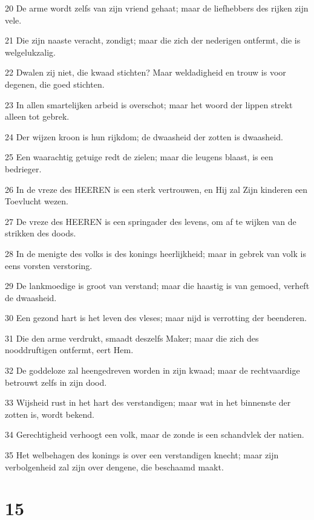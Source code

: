 \par 20 De arme wordt zelfs van zijn vriend gehaat; maar de liefhebbers des rijken zijn vele.
\par 21 Die zijn naaste veracht, zondigt; maar die zich der nederigen ontfermt, die is welgelukzalig.
\par 22 Dwalen zij niet, die kwaad stichten? Maar weldadigheid en trouw is voor degenen, die goed stichten.
\par 23 In allen smartelijken arbeid is overschot; maar het woord der lippen strekt alleen tot gebrek.
\par 24 Der wijzen kroon is hun rijkdom; de dwaasheid der zotten is dwaasheid.
\par 25 Een waarachtig getuige redt de zielen; maar die leugens blaast, is een bedrieger.
\par 26 In de vreze des HEEREN is een sterk vertrouwen, en Hij zal Zijn kinderen een Toevlucht wezen.
\par 27 De vreze des HEEREN is een springader des levens, om af te wijken van de strikken des doods.
\par 28 In de menigte des volks is des konings heerlijkheid; maar in gebrek van volk is eens vorsten verstoring.
\par 29 De lankmoedige is groot van verstand; maar die haastig is van gemoed, verheft de dwaasheid.
\par 30 Een gezond hart is het leven des vleses; maar nijd is verrotting der beenderen.
\par 31 Die den arme verdrukt, smaadt deszelfs Maker; maar die zich des nooddruftigen ontfermt, eert Hem.
\par 32 De goddeloze zal heengedreven worden in zijn kwaad; maar de rechtvaardige betrouwt zelfs in zijn dood.
\par 33 Wijsheid rust in het hart des verstandigen; maar wat in het binnenste der zotten is, wordt bekend.
\par 34 Gerechtigheid verhoogt een volk, maar de zonde is een schandvlek der natien.
\par 35 Het welbehagen des konings is over een verstandigen knecht; maar zijn verbolgenheid zal zijn over dengene, die beschaamd maakt.

\chapter{15}

